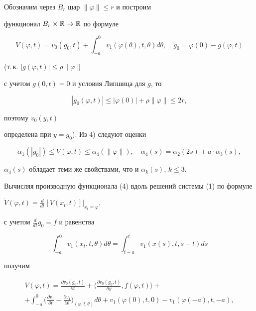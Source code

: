 Обозначим через $B_r$ шар $\|\varphi\|\leqslant r$ и построим


функционал $B_r\times\Bbb{R}\to\Bbb{R}$ по формуле


\begin{equation}


V(\varphi,t)=v_0(g_0,t)+\int_{-a}^0v_1(\varphi(\theta),t,\theta)d\theta,


\quad g_0=\varphi(0)-g(\varphi,t)


\end{equation}


(т.\,к. $|g(\varphi,t)|\leqslant\rho\|\varphi\|$ 


с учетом $g(0,t)=0$ и условия Липшица для $g$, то


$$


|g_0(\varphi,t)|\leqslant|\varphi(0)|+\rho\|\varphi\|\leqslant2r,


$$


поэтому $v_0(y,t)$


определена при $y=g_0$). Из 4) следуют оценки


\begin{equation}


\alpha_1(|g_0|)\leqslant V(\varphi,t)\leqslant\alpha_4(\|\varphi\|),\quad


\alpha_4(s)=\alpha_2(2s)+a\cdot\alpha_3(s),


\end{equation}


$\alpha_4(s)$ обладает теми же свойствами, что и $\alpha_k(s)$, $k\leqslant3$.


Вычисляя производную функционала (4) вдоль решений системы (1) по формуле


$\Dot V(\varphi,t)=\frac{d}{dt}[V(x_t,t)]|_{x_t=\varphi}$,


с учетом $\frac{d}{dt}g_0=f$ и равенства


$$


\int_{-a}^0v_1(x_t,t,\theta)d\theta=\int_{t-a}^tv_1(x(s),t,s-t)ds


$$


получим


\begin{multline}


\Dot V(\varphi,t) =\frac{\partial v_0(g_0,t)}{\partial t}+


\big\langle\frac{\partial v_0(g_0,t)}{\partial y},f(\varphi,t)


\big\rangle+ \\


+\int_{-a}^0\bigg(\frac{\partial v_1}{\partial t}


-\frac{\partial v_1}{\partial\theta}\bigg)_{(\varphi,t,\theta)}d\theta+


v_1(\varphi(0),t,0)-v_1(\varphi(-a),t,-a),


\end{multline}


